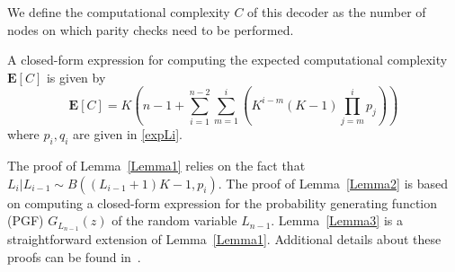 \documentclass{article}
\newif\ifproof
\begin{document}
We define the computational complexity $C$ of this decoder as the number of nodes on which parity checks need to be performed.
\begin{lemma}
\label{Lemma3}
A closed-form expression for computing the expected computational complexity $\mathbf{E}[C]$ is given by
\begin{equation*} %
\mathbf{E}[C] = K \left( n-1
+ \sum_{i=1}^{n-2} \sum_{m=1}^{i} \left( K^{i-m}(K-1)
\textstyle \prod_{j=m}^{i} p_j \right) \right)
\end{equation*}
where $p_i, q_i$ are given in \eqref{expLi}.
\end{lemma}
\begin{comment}
\begin{proof}
This proof is based on computing the expected value of number of erroneous paths surviving each stage. More details about this proof can be found in \cite{vamsi2017tree}.
\end{proof}
\end{comment}
The proof of Lemma~\ref{Lemma1} relies on the fact that $L_i \lvert L_{i-1} \sim B((L_{i-1}+1)K-1,p_i)$.
The proof of Lemma~\ref{Lemma2} is based on computing a closed-form expression for the probability generating function (PGF) $G_{L_{n-1}}(z)$ of the random variable $L_{n-1}$.
Lemma~\ref{Lemma3} is a straightforward extension of Lemma~\ref{Lemma1}.
Additional details about these proofs can be found in~\cite{vamsi2017tree}.
\ifproof
\end{document}
